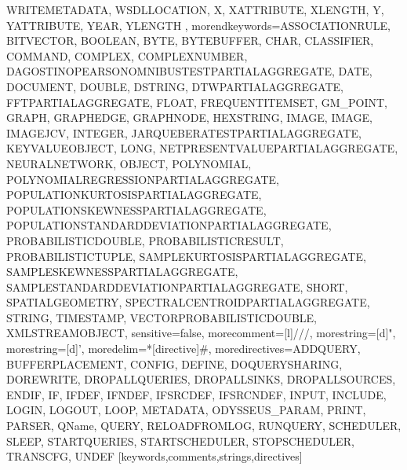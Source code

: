 {{WRITEMETADATA, WSDLLOCATION, X, XATTRIBUTE, XLENGTH, Y, YATTRIBUTE, YEAR, YLENGTH%
      },%
   morendkeywords={ASSOCIATIONRULE, BITVECTOR, BOOLEAN, BYTE, BYTEBUFFER, CHAR, CLASSIFIER, COMMAND, COMPLEX, COMPLEXNUMBER, DAGOSTINOPEARSONOMNIBUSTESTPARTIALAGGREGATE, DATE, DOCUMENT, DOUBLE, DSTRING, DTWPARTIALAGGREGATE, FFTPARTIALAGGREGATE, FLOAT, FREQUENTITEMSET, GM_POINT, GRAPH, GRAPHEDGE, GRAPHNODE, HEXSTRING, IMAGE, IMAGE, IMAGEJCV, INTEGER, JARQUEBERATESTPARTIALAGGREGATE, KEYVALUEOBJECT, LONG, NETPRESENTVALUEPARTIALAGGREGATE, NEURALNETWORK, OBJECT, POLYNOMIAL, POLYNOMIALREGRESSIONPARTIALAGGREGATE, POPULATIONKURTOSISPARTIALAGGREGATE, POPULATIONSKEWNESSPARTIALAGGREGATE, POPULATIONSTANDARDDEVIATIONPARTIALAGGREGATE, PROBABILISTICDOUBLE, PROBABILISTICRESULT, PROBABILISTICTUPLE, SAMPLEKURTOSISPARTIALAGGREGATE, SAMPLESKEWNESSPARTIALAGGREGATE, SAMPLESTANDARDDEVIATIONPARTIALAGGREGATE, SHORT, SPATIALGEOMETRY, SPECTRALCENTROIDPARTIALAGGREGATE, STRING, TIMESTAMP, VECTORPROBABILISTICDOUBLE, XMLSTREAMOBJECT},%
   sensitive=false,
   morecomment=[l]///,%
   morestring=[d]",%
   morestring=[d]',%
   moredelim=*[directive]\#,%
   moredirectives={ADDQUERY, BUFFERPLACEMENT, CONFIG, DEFINE, DOQUERYSHARING, DOREWRITE, DROPALLQUERIES, DROPALLSINKS, DROPALLSOURCES, ENDIF, IF, IFDEF, IFNDEF, IFSRCDEF, IFSRCNDEF, INPUT, INCLUDE, LOGIN, LOGOUT, LOOP, METADATA, ODYSSEUS_PARAM, PRINT, PARSER, QName, QUERY, RELOADFROMLOG, RUNQUERY, SCHEDULER, SLEEP, STARTQUERIES, STARTSCHEDULER, STOPSCHEDULER, TRANSCFG, UNDEF}%
}[keywords,comments,strings,directives]


